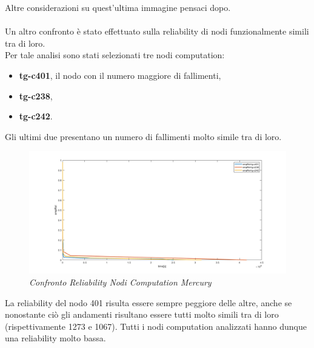 Altre considerazioni su quest'ultima immagine pensaci dopo.
\\
\\
Un altro confronto è stato effettuato sulla reliability di nodi funzionalmente simili tra di loro.
\\Per tale analisi sono stati selezionati tre nodi computation:
\begin{itemize}
	\item \textbf{tg-c401}, il nodo con il numero maggiore di fallimenti,
	\item \textbf{tg-c238},
	\item \textbf{tg-c242}.
\end{itemize}
Gli ultimi due presentano un numero di fallimenti molto simile tra di loro.
\begin{figure}[H]
	\centering
	\includegraphics[width=\textwidth]{img/hw6/RelCompMercury.png}
	\caption{\textit{Confronto Reliability Nodi Computation Mercury}}
\end{figure}
La reliability del nodo 401 risulta essere sempre peggiore delle altre, anche se nonostante ciò gli andamenti risultano essere tutti molto simili tra di loro (rispettivamente 1273 e 1067). Tutti i nodi computation analizzati hanno dunque una reliability molto bassa.
